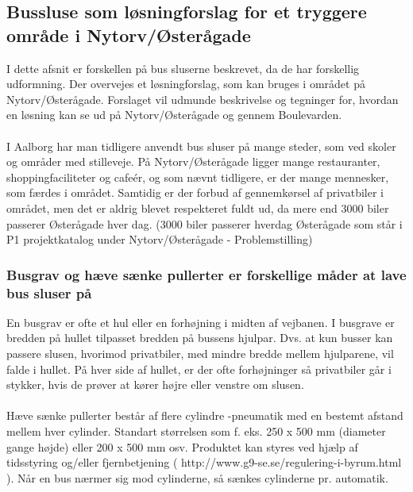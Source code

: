 \subsection{Bussluse som løsningforslag for et tryggere område i Nytorv/Østerågade}
\label{bussluselosningforslag}



I dette afsnit er forskellen på bus sluserne beskrevet, da de har forskellig udformning. Der overvejes et løsningforslag, som kan bruges i området på Nytorv/Østerågade. Forslaget vil udmunde beskrivelse og tegninger for, hvordan en løsning kan se ud på Nytorv/Østerågade og gennem Boulevarden.
\\\\
I Aalborg har man tidligere anvendt bus sluser på mange steder, som ved skoler og områder med stilleveje. På Nytorv/Østerågade ligger mange restauranter, shoppingfaciliteter og cafeér, og som nævnt tidligere, er der mange mennesker, som færdes i området. Samtidig er der forbud af gennemkørsel af privatbiler i området, men det er aldrig blevet respekteret fuldt ud, da mere end 3000 biler passerer Østerågade hver dag. (3000 biler passerer hverdag Østerågade som står i P1 projektkatalog under Nytorv/Østerågade - Problemstilling)

\subsubsection{Busgrav og hæve sænke pullerter er forskellige måder at lave bus sluser på}

En busgrav er ofte et hul eller en forhøjning i midten af vejbanen. I busgrave er bredden på hullet tilpasset bredden på bussens hjulpar. Dvs. at kun busser kan passere slusen, hvorimod privatbiler, med mindre bredde mellem hjulparene, vil falde i hullet. På hver side af hullet, er der ofte forhøjninger så privatbiler går i stykker, hvis de prøver at kører højre eller venstre om slusen. 
\\\\
Hæve sænke pullerter består af flere cylindre -pneumatik med en bestemt afstand mellem hver cylinder. Standart størrelsen som f. eks. 250 x 500 mm (diameter gange højde) eller 200 x 500 mm osv. Produktet kan styres ved hjælp af tidsstyring og/eller fjernbetjening ( http://www.g9-se.se/regulering-i-byrum.html ). Når en bus nærmer sig mod cylinderne, så sænkes cylinderne pr. automatik. 

